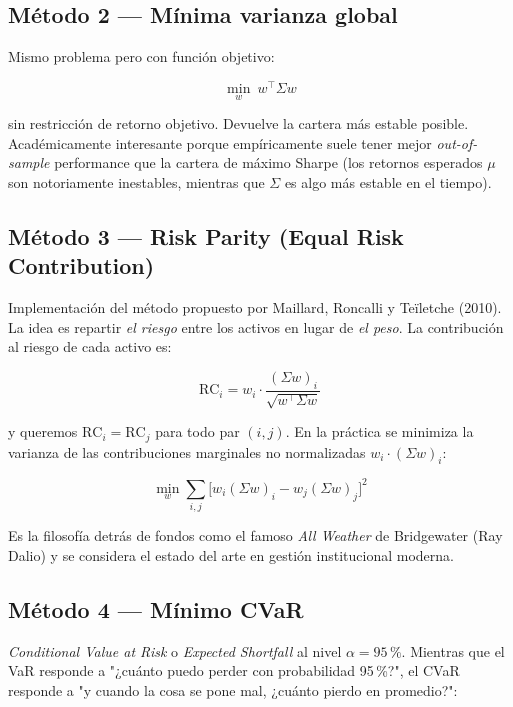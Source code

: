 \documentclass[11pt,a4paper]{article}
\begin{document}
\subsection{Método 2 — Mínima varianza global}

Mismo problema pero con función objetivo:

\begin{equation}
\min_w\ w^\top \Sigma w
\end{equation}

sin restricción de retorno objetivo. Devuelve la cartera más estable posible. Académicamente interesante porque empíricamente suele tener mejor \textit{out-of-sample} performance que la cartera de máximo Sharpe (los retornos esperados $\mu$ son notoriamente inestables, mientras que $\Sigma$ es algo más estable en el tiempo).

\subsection{Método 3 — Risk Parity (Equal Risk Contribution)}

Implementación del método propuesto por Maillard, Roncalli y Teïletche (2010). La idea es repartir \textit{el riesgo} entre los activos en lugar de \textit{el peso}. La contribución al riesgo de cada activo es:

\begin{equation}
\mathrm{RC}_i = w_i \cdot \frac{(\Sigma w)_i}{\sqrt{w^\top \Sigma w}}
\end{equation}

y queremos $\mathrm{RC}_i = \mathrm{RC}_j$ para todo par $(i,j)$. En la práctica se minimiza la varianza de las contribuciones marginales no normalizadas $w_i \cdot (\Sigma w)_i$:

\begin{equation}
\min_w \sum_{i,j} \big[ w_i (\Sigma w)_i - w_j (\Sigma w)_j \big]^2
\end{equation}

Es la filosofía detrás de fondos como el famoso \textit{All Weather} de Bridgewater (Ray Dalio) y se considera el estado del arte en gestión institucional moderna.

\subsection{Método 4 — Mínimo CVaR}

\textit{Conditional Value at Risk} o \textit{Expected Shortfall} al nivel $\alpha=95\,\%$. Mientras que el VaR responde a "¿cuánto puedo perder con probabilidad 95\,\%?", el CVaR responde a "y cuando la cosa se pone mal, ¿cuánto pierdo en promedio?":
\end{document}
